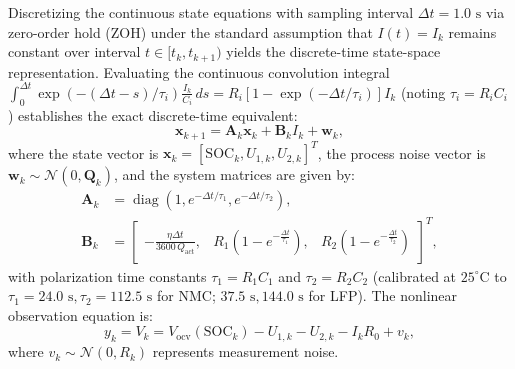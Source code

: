 \documentclass[balance,nocopyright,upint,varvw,hyphenate,barcolor=NavyBlue,nolists]{asmejour}
\begin{document}
Discretizing the continuous state equations with sampling interval $\Delta t = 1.0\text{ s}$ via zero-order hold (ZOH) under the standard assumption that $I(t) = I_k$ remains constant over interval $t \in [t_k, t_{k+1})$ yields the discrete-time state-space representation. Evaluating the continuous convolution integral $\int_0^{\Delta t} \exp(-(\Delta t - s)/\tau_i) \frac{I_k}{C_i}\,ds = R_i [1 - \exp(-\Delta t/\tau_i)] I_k$ (noting $\tau_i = R_i C_i$) establishes the exact discrete-time equivalent:
\begin{equation}\label{eqn:state_space_discrete}
\mathbf{x}_{k+1} = \mathbf{A}_k \mathbf{x}_k + \mathbf{B}_k I_k + \mathbf{w}_k,
\end{equation}
where the state vector is $\mathbf{x}_k = [\text{SOC}_k, U_{1,k}, U_{2,k}]^T$, the process noise vector is $\mathbf{w}_k \sim \mathcal{N}(0, \mathbf{Q}_k)$, and the system matrices are given by:
\begin{align}
\mathbf{A}_k &= \operatorname{diag}\left(1, e^{-\Delta t/\tau_1}, e^{-\Delta t/\tau_2}\right), \label{eqn:Ak_mat} \\
\mathbf{B}_k &= \begin{bmatrix}
-\frac{\eta \Delta t}{3600\,Q_{\text{act}}}, & R_1\left(1 - e^{-\frac{\Delta t}{\tau_1}}\right), & R_2\left(1 - e^{-\frac{\Delta t}{\tau_2}}\right)
\end{bmatrix}^T, \label{eqn:Bk_mat}
\end{align}
with polarization time constants $\tau_1 = R_1 C_1$ and $\tau_2 = R_2 C_2$ (calibrated at $25^\circ\text{C}$ to $\tau_1 = 24.0\text{ s}, \tau_2 = 112.5\text{ s}$ for NMC; $37.5\text{ s}, 144.0\text{ s}$ for LFP). The nonlinear observation equation is:
\begin{equation}\label{eqn:measurement_eq}
y_k = V_k = V_{\text{ocv}}(\text{SOC}_k) - U_{1,k} - U_{2,k} - I_k R_0 + v_k,
\end{equation}
where $v_k \sim \mathcal{N}(0, R_k)$ represents measurement noise.
\end{document}
